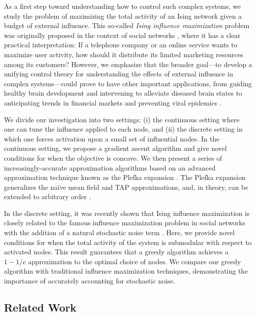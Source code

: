 \documentclass[letterpaper]{article} %
\begin{document}
As a first step toward understanding how to control such complex systems, we study the problem of maximizing the total activity of an Ising network given a budget of external influence. This so-called \textit{Ising influence maximization} problem was originally proposed in the context of social networks \cite{Lynn-01}, where it has a clear practical interpretation: If a telephone company or an online service wants to maximize user activity, how should it distribute its limited marketing resources among its customers? However, we emphasize that the broader goal---to develop a unifying control theory for understanding the effects of external influence in complex systems---could prove to have other important applications, from guiding healthy brain development \cite{Goddard-01} and intervening to alleviate diseased brain states \cite{Goddard-02} to anticipating trends in financial markets \cite{Mantegna-01} and preventing viral epidemics \cite{Pastor-01}.

We divide our investigation into two settings: (i) the continuous setting where one can tune the influence applied to each node, and (ii) the discrete setting in which one forces activation upon a small set of influential nodes. In the continuous setting, we propose a gradient ascent algorithm and give novel conditions for when the objective is concave. We then present a series of increasingly-accurate approximation algorithms based on an advanced approximation technique known as the Plefka expansion \cite{Plefka-01}. The Plefka expansion generalizes the na\"{i}ve mean field and TAP approximations, and, in theory, can be extended to arbitrary order \cite{Yedidia-01}.

In the discrete setting, it was recently shown that Ising influence maximization is closely related to the famous influence maximization problem in social networks \cite{Kempe-01} with the addition of a natural stochastic noise term \cite{Lynn-02}. Here, we provide novel conditions for when the total activity of the system is submodular with respect to activated nodes. This result guarantees that a greedy algorithm achieves a $1-1/e$ approximation to the optimal choice of nodes. We compare our greedy algorithm with traditional influence maximization techniques, demonstrating the importance of accurately accounting for stochastic noise.

\subsection{Related Work}
\end{document}
